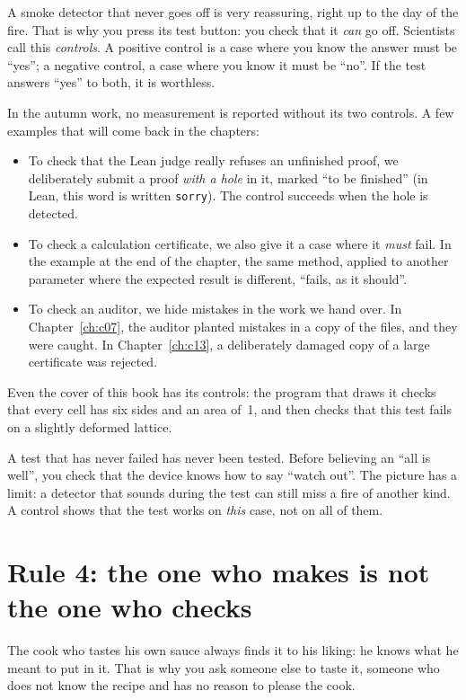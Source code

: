 A smoke detector that never goes off is very reassuring, right up to the day of the fire. That is why you press its
test button: you check that it \emph{can} go off. Scientists call this \emph{controls}. A positive control is a case
where you know the answer must be ``yes''; a negative control, a case where you know it must be ``no''. If the test
answers ``yes'' to both, it is worthless.

In the autumn work, no measurement is reported without its two controls. A few examples that will come back in the
chapters:
\begin{itemize}
\item To check that the Lean judge really refuses an unfinished proof, we deliberately submit a proof \emph{with a
hole} in it, marked ``to be finished'' (in Lean, this word is written \texttt{sorry}). The control succeeds when the
hole is detected.
\item To check a calculation certificate, we also give it a case where it \emph{must} fail. In the example at the end
of the chapter, the same method, applied to another parameter where the expected result is different, ``fails, as it
should''.
\item To check an auditor, we hide mistakes in the work we hand over. In Chapter~\ref{ch:c07}, the auditor planted
mistakes in a copy of the files, and they were caught. In Chapter~\ref{ch:c13}, a deliberately damaged copy of a large
certificate was rejected.
\end{itemize}
Even the cover of this book has its controls: the program that draws it checks that every cell has six sides and an
area of~1, and then checks that this test fails on a slightly deformed lattice.

\begin{analogie}
A test that has never failed has never been tested. Before believing an ``all is well'', you check that the device
knows how to say ``watch out''. The picture has a limit: a detector that sounds during the test can still miss a fire
of another kind. A control shows that the test works on \emph{this} case, not on all of them.
\end{analogie}

\section{Rule 4: the one who makes is not the one who checks}

The cook who tastes his own sauce always finds it to his liking: he knows what he meant to put in it. That is why you
ask someone else to taste it, someone who does not know the recipe and has no reason to please the cook.

